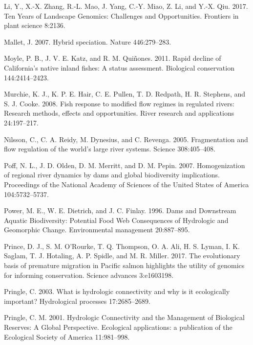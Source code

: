 \documentclass[twoside,12pt,final]{ucthesis-CA2012}
\begin{document}
\begin{ucmainmatter}
\leavevmode\hypertarget{ref-li_ten_2017}{}%
Li, Y., X.-X. Zhang, R.-L. Mao, J. Yang, C.-Y. Miao, Z. Li, and Y.-X.
Qiu. 2017. Ten Years of Landscape Genomics: Challenges and
Opportunities. Frontiers in plant science 8:2136.

\leavevmode\hypertarget{ref-mallet_hybrid_2007}{}%
Mallet, J. 2007. Hybrid speciation. Nature 446:279--283.

\leavevmode\hypertarget{ref-moyle_rapid_2011}{}%
Moyle, P. B., J. V. E. Katz, and R. M. Quiñones. 2011. Rapid decline of
California's native inland fishes: A status assessment. Biological
conservation 144:2414--2423.

\leavevmode\hypertarget{ref-murchie_fish_2008}{}%
Murchie, K. J., K. P. E. Hair, C. E. Pullen, T. D. Redpath, H. R.
Stephens, and S. J. Cooke. 2008. Fish response to modified flow regimes
in regulated rivers: Research methods, effects and opportunities. River
research and applications 24:197--217.

\leavevmode\hypertarget{ref-nilsson_fragmentation_2005}{}%
Nilsson, C., C. A. Reidy, M. Dynesius, and C. Revenga. 2005.
Fragmentation and flow regulation of the world's large river systems.
Science 308:405--408.

\leavevmode\hypertarget{ref-poff_homogenization_2007}{}%
Poff, N. L., J. D. Olden, D. M. Merritt, and D. M. Pepin. 2007.
Homogenization of regional river dynamics by dams and global
biodiversity implications. Proceedings of the National Academy of
Sciences of the United States of America 104:5732--5737.

\leavevmode\hypertarget{ref-power_dams_1996}{}%
Power, M. E., W. E. Dietrich, and J. C. Finlay. 1996. Dams and
Downstream Aquatic Biodiversity: Potential Food Web Consequences of
Hydrologic and Geomorphic Change. Environmental management 20:887--895.

\leavevmode\hypertarget{ref-prince_evolutionary_2017}{}%
Prince, D. J., S. M. O'Rourke, T. Q. Thompson, O. A. Ali, H. S. Lyman,
I. K. Saglam, T. J. Hotaling, A. P. Spidle, and M. R. Miller. 2017. The
evolutionary basis of premature migration in Pacific salmon highlights
the utility of genomics for informing conservation. Science advances
3:e1603198.

\leavevmode\hypertarget{ref-pringle_what_2003}{}%
Pringle, C. 2003. What is hydrologic connectivity and why is it
ecologically important? Hydrological processes 17:2685--2689.

\leavevmode\hypertarget{ref-pringle_hydrologic_2001}{}%
Pringle, C. M. 2001. Hydrologic Connectivity and the Management of
Biological Reserves: A Global Perspective. Ecological applications: a
publication of the Ecological Society of America 11:981--998.


\end{ucmainmatter}
\end{document}
